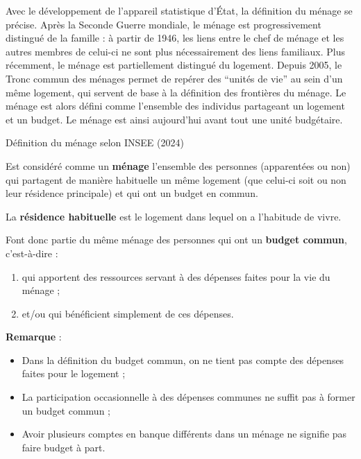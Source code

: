 \documentclass[
  12pt,
]{book}
\begin{document}
Avec le développement de l'appareil statistique d'État, la définition du
ménage se précise. Après la Seconde Guerre mondiale, le ménage est
progressivement distingué de la famille : à partir de 1946, les liens
entre le chef de ménage et les autres membres de celui-ci ne sont plus
nécessairement des liens familiaux. Plus récemment, le ménage est
partiellement distingué du logement. Depuis 2005, le Tronc commun des
ménages permet de repérer des ``unités de vie'' au sein d'un même
logement, qui servent de base à la définition des frontières du ménage.
Le ménage est alors défini comme l'ensemble des individus partageant un
logement et un budget. Le ménage est ainsi aujourd'hui avant tout une
unité budgétaire.

\begin{encadre}{Définition du ménage selon INSEE (2024)}

Est considéré comme un \textbf{ménage} l'ensemble des personnes (apparentées ou non) qui partagent de manière habituelle un même logement (que celui-ci soit ou non leur résidence principale) et qui ont un budget en commun.

La \textbf{résidence habituelle} est le logement dans lequel on a l'habitude de vivre.

Font donc partie du même ménage des personnes qui ont un \textbf{budget commun}, c'est-à-dire :

\begin{enumerate}

\item{qui apportent des ressources servant à des dépenses faites pour la vie du ménage ;}

\item{et/ou qui bénéficient simplement de ces dépenses.}

\end{enumerate}

\tcblower

\textbf{Remarque} : 

\begin{itemize}

\item{Dans la définition du budget commun, on ne tient pas compte des dépenses faites pour le logement ;}

\item{La participation occasionnelle à des dépenses communes ne suffit pas à former un budget commun ;}

\item{Avoir plusieurs comptes en banque différents dans un ménage ne signifie pas faire budget à part.}

\end{itemize}

\end{encadre}
\end{document}
